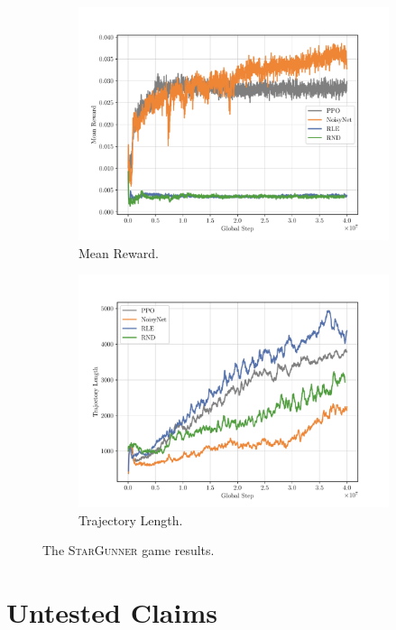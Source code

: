 \begin{figure}[h!]
\begin{subfigure}[b]{0.45\textwidth}
    \includegraphics[width=\textwidth]{figures/plot_StarGunner_RewardsMean.pdf}
    \caption{Mean Reward.}
    \label{fig:stargunner-rewards}
  \end{subfigure}
  \hfill
  \begin{subfigure}[b]{0.45\textwidth}
    \centering
    \includegraphics[width=\textwidth]{figures/plot_StarGunner_TrajectoryLength.pdf}
    \caption{Trajectory Length.}
    \label{fig:stargunner-trajectorylength}
  \end{subfigure}
  \caption{The \textsc{StarGunner} game results.}
\end{figure}

\clearpage
\hypertarget{untested-claims}{\section{Untested Claims}}

